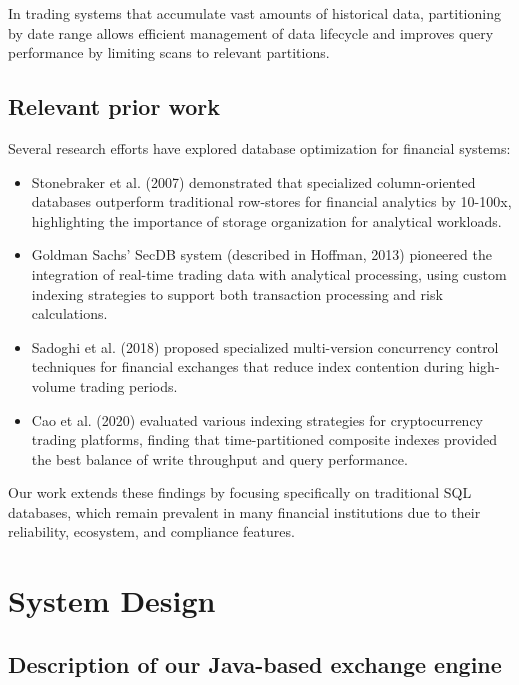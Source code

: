 \documentclass[11pt,a4paper]{article}
\begin{document}
In trading systems that accumulate vast amounts of historical data, partitioning by date range allows efficient management of data lifecycle and improves query performance by limiting scans to relevant partitions.

\subsection{Relevant prior work}

Several research efforts have explored database optimization for financial systems:

\begin{itemize}
    \item Stonebraker et al. (2007) demonstrated that specialized column-oriented databases outperform traditional row-stores for financial analytics by 10-100x, highlighting the importance of storage organization for analytical workloads.
    
    \item Goldman Sachs' SecDB system (described in Hoffman, 2013) pioneered the integration of real-time trading data with analytical processing, using custom indexing strategies to support both transaction processing and risk calculations.
    
    \item Sadoghi et al. (2018) proposed specialized multi-version concurrency control techniques for financial exchanges that reduce index contention during high-volume trading periods.
    
    \item Cao et al. (2020) evaluated various indexing strategies for cryptocurrency trading platforms, finding that time-partitioned composite indexes provided the best balance of write throughput and query performance.
\end{itemize}

Our work extends these findings by focusing specifically on traditional SQL databases, which remain prevalent in many financial institutions due to their reliability, ecosystem, and compliance features.

\section{System Design}

\subsection{Description of our Java-based exchange engine}
\end{document}
